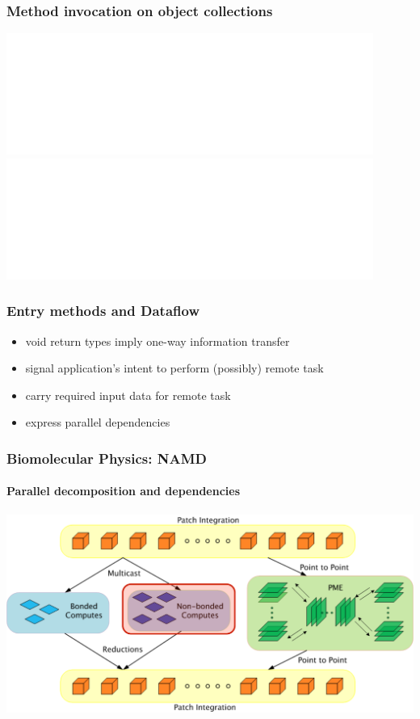 \begin{frame}
\frametitle{Method invocation on object collections}
	\begin{center}
        \includegraphics<1>[width=0.9\textwidth]{../figures/progmodel/13-rmi-return-values.pdf}
        \includegraphics<2>[width=0.9\textwidth]{../figures/progmodel/14-rmi-collective.pdf}
	\end{center}
\end{frame}


\begin{frame}
\frametitle{Entry methods and Dataflow}
    \begin{itemize}[<+->]
        \item void return types imply one-way information transfer
        \item signal application's intent to perform (possibly) remote task
        \item carry required input data for remote task
        \item express parallel dependencies
    \end{itemize}
\end{frame}


\begin{frame}
\frametitle{Biomolecular Physics: NAMD}
\framesubtitle{Parallel decomposition and dependencies}
\includegraphics[width=\textwidth]{../figures/md_parallelize.pdf}
\end{frame}


